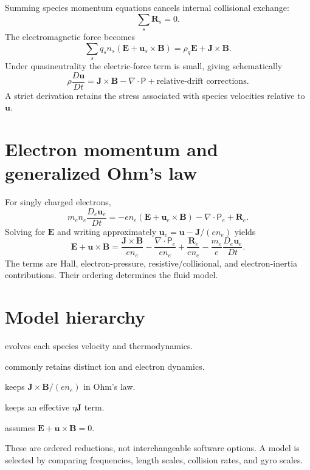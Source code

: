 \documentclass[11pt]{article}
\begin{document}
Summing species momentum equations cancels internal collisional exchange:
\begin{equation}
\sum_s\mathbf R_s=0.
\end{equation}
The electromagnetic force becomes
\begin{equation}
\sum_sq_sn_s(\mathbf E+\mathbf u_s\times\mathbf B)
=\rho_q\mathbf E+\mathbf J\times\mathbf B.
\end{equation}
Under quasineutrality the electric-force term is small, giving schematically
\begin{equation}
\rho\frac{D\mathbf u}{Dt}
=\mathbf J\times\mathbf B-\nabla\cdot\mathsf P+\text{relative-drift corrections}.
\end{equation}
A strict derivation retains the stress associated with species velocities relative to $\mathbf u$.


\section{Electron momentum and generalized Ohm's law}

For singly charged electrons,
\begin{equation}
m_en_e\frac{D_e\mathbf u_e}{Dt}
=-en_e(\mathbf E+\mathbf u_e\times\mathbf B)
-\nabla\cdot\mathsf P_e+\mathbf R_e.
\end{equation}
Solving for $\mathbf E$ and writing approximately $\mathbf u_e=\mathbf u-\mathbf J/(en_e)$ yields
\begin{equation}
\mathbf E+\mathbf u\times\mathbf B
=\frac{\mathbf J\times\mathbf B}{en_e}
-\frac{\nabla\cdot\mathsf P_e}{en_e}
+\frac{\mathbf R_e}{en_e}
-\frac{m_e}{e}\frac{D_e\mathbf u_e}{Dt}.
\end{equation}
The terms are Hall, electron-pressure, resistive/collisional, and electron-inertia contributions. Their ordering determines the fluid model.


\section{Model hierarchy}

\begin{description}[leftmargin=2.3em]
\item[Multifluid:] evolves each species velocity and thermodynamics.
\item[Two-fluid:] commonly retains distinct ion and electron dynamics.
\item[Hall MHD:] keeps $\mathbf J\times\mathbf B/(en_e)$ in Ohm's law.
\item[Resistive MHD:] keeps an effective $\eta\mathbf J$ term.
\item[Ideal MHD:] assumes $\mathbf E+\mathbf u\times\mathbf B=0$.
\end{description}
These are ordered reductions, not interchangeable software options. A model is selected by comparing frequencies, length scales, collision rates, and gyro scales.
\end{document}
